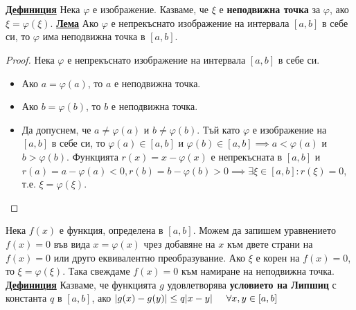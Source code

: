 \documentclass{article}
\begin{document}
\section*{\centering \color{lightGreen}{Числен анализ}}

\subsection*{\color{lightGreen}{33. Итерационни методи за решаване на нелинейни уравнения.}}
\textbf{\underline{Дефиниция}}
Нека $\varphi$ е изображение. Казваме, че $\xi$ е \textbf{неподвижна точка} за $\varphi$, ако $\xi = \varphi(\xi)$. \newline\newline
\textbf{\underline{Лема}} \newline
Ако $\varphi$ е непрекъснато изображение на интервала $[a, b]$ в себе си, то $\varphi$ има неподвижна точка в $[a, b]$.
\begin{proof}
Нека $\varphi$ е непрекъснато изображение на интервала $[a, b]$ в себе си.
\begin{itemize}
    \item Ако $a = \varphi(a)$, то $a$ е неподвижна точка.
    \item Ако $b = \varphi(b)$, то $b$ е неподвижна точка.
    \item Да допуснем, че $a \neq \varphi(a)$ и $b \neq \varphi(b)$. Тъй като $\varphi$ е изображение на $[a, b]$ в себе си, то $\varphi(a) \in [a, b]$ и
    $\varphi(b) \in [a, b] \implies a < \varphi(a)$ и $b > \varphi(b)$. Функцията $r(x) = x - \varphi(x)$ е непрекъсната в $[a, b]$ и $r(a) =
    a - \varphi(a) < 0, r(b) = b - \varphi(b) > 0 \implies \exists \xi \in [a, b] : r(\xi) = 0$, т.е. $\xi = \varphi(\xi)$.
\end{itemize}
\end{proof}
Нека $f(x)$ е функция, определена в $[a, b]$. Можем да запишем уравнението $f(x) = 0$ във вида $x = \varphi(x)$ чрез
добавяне на $x$ към двете страни на $f(x) = 0$ или друго еквивалентно преобразувание. Ако $\xi$ е корен на $f(x) = 0$,
то $\xi = \varphi(\xi)$. Така свеждаме $f(x) = 0$ към намиране на неподвижна точка. \newline\newline
\textbf{\underline{Дефиниция}}
Казваме, че функцията $g$ удовлетворява \textbf{условието на Липшиц} с константа $q$ в $[a, b]$, ако $|g(x) - g(y)| \le q|x - y| \hspace{0.5cm}
\forall x, y \in [a, b]$ \newline\newline
\end{document}
